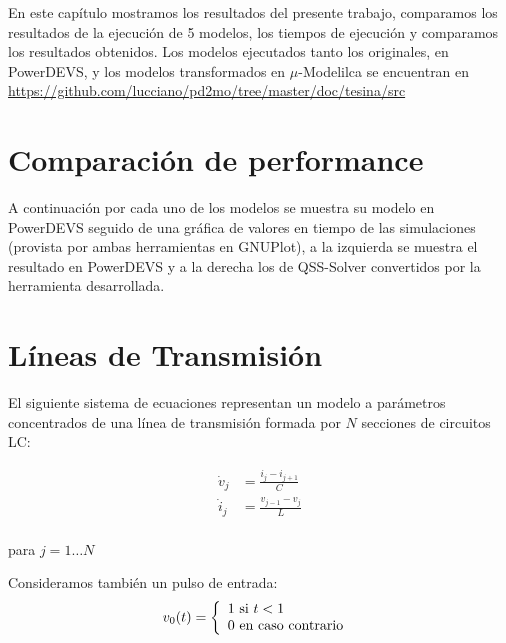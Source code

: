 	En este capítulo mostramos los resultados del presente trabajo, comparamos los resultados de la ejecución de 5 modelos, los tiempos de ejecución y 
		comparamos los resultados obtenidos. Los modelos ejecutados tanto los originales, en PowerDEVS, y los modelos transformados en 
		$\mu$-Modelilca se encuentran en \url{https://github.com/lucciano/pd2mo/tree/master/doc/tesina/src}

\section{Comparación de performance}
	A continuación por cada uno de los modelos se muestra su modelo en PowerDEVS seguido de una gráfica de valores en tiempo de las simulaciones 
	(provista por ambas herramientas en GNUPlot), 
	a la izquierda se muestra el resultado en PowerDEVS y a la derecha los de QSS-Solver convertidos por la herramienta desarrollada.

\section{Líneas de Transmisión}
	El siguiente sistema de ecuaciones representan un modelo a parámetros concentrados de una línea de transmisión formada por $N$ secciones de circuitos LC:


\begin{equation*}
\begin{split}
\dot{v}_{j} &= \frac{i_{j} - i_{j+1}}{C} \\
\dot{i}_{j} &= \frac{v_{j-1} - v_{j}}{L} \\	
\end{split}
\end{equation*}

para $j = 1 \dots N$

Consideramos también un pulso de entrada:
\begin{equation}
v_0(t) = \left\{ 
  \begin{array}{l l}
    1 \text{ si } t < 1 \\
    0 \text{ en caso contrario }
  \end{array} \right.
\end{equation}

